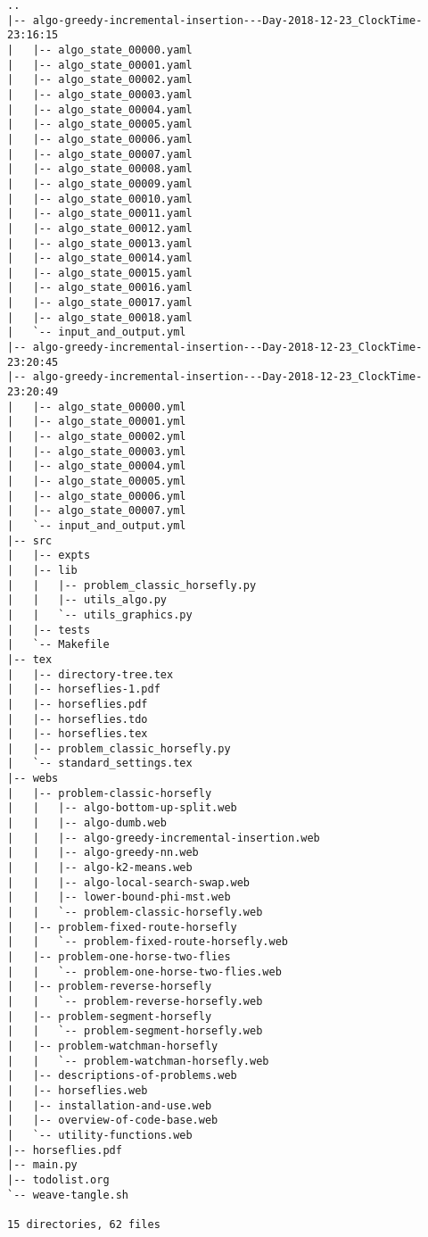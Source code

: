 \begin{verbatim}
..
|-- algo-greedy-incremental-insertion---Day-2018-12-23_ClockTime-23:16:15
|   |-- algo_state_00000.yaml
|   |-- algo_state_00001.yaml
|   |-- algo_state_00002.yaml
|   |-- algo_state_00003.yaml
|   |-- algo_state_00004.yaml
|   |-- algo_state_00005.yaml
|   |-- algo_state_00006.yaml
|   |-- algo_state_00007.yaml
|   |-- algo_state_00008.yaml
|   |-- algo_state_00009.yaml
|   |-- algo_state_00010.yaml
|   |-- algo_state_00011.yaml
|   |-- algo_state_00012.yaml
|   |-- algo_state_00013.yaml
|   |-- algo_state_00014.yaml
|   |-- algo_state_00015.yaml
|   |-- algo_state_00016.yaml
|   |-- algo_state_00017.yaml
|   |-- algo_state_00018.yaml
|   `-- input_and_output.yml
|-- algo-greedy-incremental-insertion---Day-2018-12-23_ClockTime-23:20:45
|-- algo-greedy-incremental-insertion---Day-2018-12-23_ClockTime-23:20:49
|   |-- algo_state_00000.yml
|   |-- algo_state_00001.yml
|   |-- algo_state_00002.yml
|   |-- algo_state_00003.yml
|   |-- algo_state_00004.yml
|   |-- algo_state_00005.yml
|   |-- algo_state_00006.yml
|   |-- algo_state_00007.yml
|   `-- input_and_output.yml
|-- src
|   |-- expts
|   |-- lib
|   |   |-- problem_classic_horsefly.py
|   |   |-- utils_algo.py
|   |   `-- utils_graphics.py
|   |-- tests
|   `-- Makefile
|-- tex
|   |-- directory-tree.tex
|   |-- horseflies-1.pdf
|   |-- horseflies.pdf
|   |-- horseflies.tdo
|   |-- horseflies.tex
|   |-- problem_classic_horsefly.py
|   `-- standard_settings.tex
|-- webs
|   |-- problem-classic-horsefly
|   |   |-- algo-bottom-up-split.web
|   |   |-- algo-dumb.web
|   |   |-- algo-greedy-incremental-insertion.web
|   |   |-- algo-greedy-nn.web
|   |   |-- algo-k2-means.web
|   |   |-- algo-local-search-swap.web
|   |   |-- lower-bound-phi-mst.web
|   |   `-- problem-classic-horsefly.web
|   |-- problem-fixed-route-horsefly
|   |   `-- problem-fixed-route-horsefly.web
|   |-- problem-one-horse-two-flies
|   |   `-- problem-one-horse-two-flies.web
|   |-- problem-reverse-horsefly
|   |   `-- problem-reverse-horsefly.web
|   |-- problem-segment-horsefly
|   |   `-- problem-segment-horsefly.web
|   |-- problem-watchman-horsefly
|   |   `-- problem-watchman-horsefly.web
|   |-- descriptions-of-problems.web
|   |-- horseflies.web
|   |-- installation-and-use.web
|   |-- overview-of-code-base.web
|   `-- utility-functions.web
|-- horseflies.pdf
|-- main.py
|-- todolist.org
`-- weave-tangle.sh

15 directories, 62 files
\end{verbatim}
